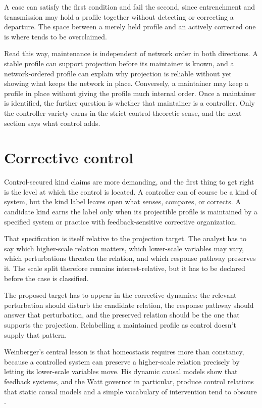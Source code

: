 \documentclass[12pt]{article}
\begin{document}
A case can satisfy the first condition and fail the second, since entrenchment and
transmission may hold a profile together without detecting or correcting a
departure. The space between a merely held profile and an actively corrected one is
where  tends to be overclaimed.

Read this way, maintenance is independent of network order in both directions. A
stable profile can support projection before its maintainer is known, and a
network-ordered profile can explain why projection is reliable without yet showing
what keeps the network in place. Conversely, a maintainer may keep a profile in
place without giving the profile much internal order. Once a maintainer is
identified, the further question is whether that maintainer is a controller. Only
the controller variety earns  in the strict control-theoretic
sense, and the next section says what control adds.

\section{Corrective control}

Control-secured kind claims are more demanding, and the first thing to get right
is the level at which the control is located. A controller can of course be a kind
of system, but the kind label leaves open what senses, compares, or corrects. A
candidate kind earns the  label only when its projectible
profile is maintained by a specified system or practice with feedback-sensitive
corrective organization.

That specification is itself relative to the projection target. The analyst has
to say which higher-scale relation matters, which lower-scale variables may vary,
which perturbations threaten the relation, and which response pathway preserves
it. The scale split therefore remains interest-relative, but it has to be declared
before the case is classified.

The proposed target has to appear in the corrective dynamics: the relevant
perturbation should disturb the candidate relation, the response pathway should
answer that perturbation, and the preserved relation should be the one that
supports the projection. Relabelling a maintained profile as control doesn't
supply that pattern.

Weinberger's central lesson is that homeostasis requires more than constancy,
because a controlled system can preserve a higher-scale relation precisely by
letting its lower-scale variables move. His dynamic causal models show that
feedback systems, and the Watt governor in particular, produce control relations
that static causal models and a simple vocabulary of intervention tend to obscure
\citep{weinberger2026HomeostasisCausalControl}.
\end{document}
